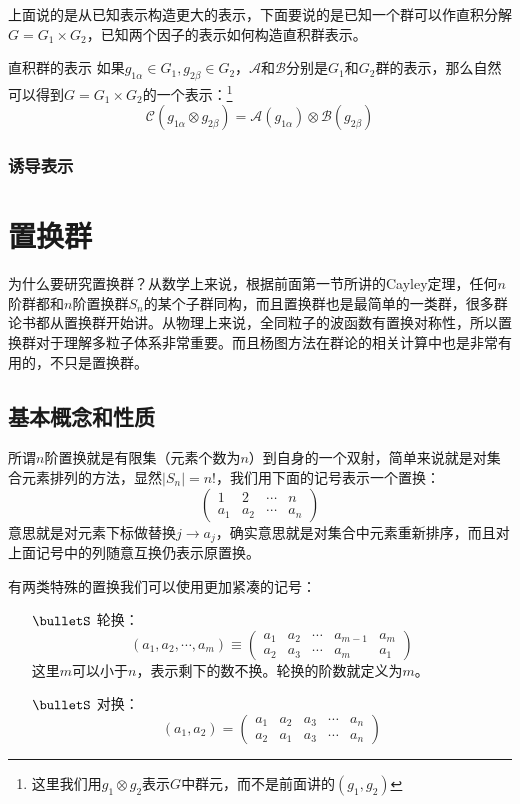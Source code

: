 上面说的是从已知表示构造更大的表示，下面要说的是已知一个群可以作直积分解$G=G_1\times G_2$，已知两个因子的表示如何构造直积群表示。
\begin{define}{直积群的表示}
	如果$g_{1\alpha}\in G_1,g_{2\beta}\in G_2$，$\mathscr{A}$和$\mathscr{B}$分别是$G_1$和$G_2$群的表示，那么自然可以得到$G=G_1\times G_2$的一个表示：\footnote{这里我们用$g_1\otimes g_2$表示$G$中群元，而不是前面讲的$(g_1,g_2)$}
	\[\mathscr{C}(g_{1\alpha}\otimes g_{2\beta})=\mathscr{A}(g_{1\alpha})\otimes\mathscr{B}(g_{2\beta})\]
\end{define}
\subsubsection*{诱导表示}




\section{置换群}
为什么要研究置换群？从数学上来说，根据前面第一节所讲的Cayley定理，任何$n$阶群都和$n$阶置换群$S_n$的某个子群同构，而且置换群也是最简单的一类群，很多群论书都从置换群开始讲。从物理上来说，全同粒子的波函数有置换对称性，所以置换群对于理解多粒子体系非常重要。而且杨图方法在群论的相关计算中也是非常有用的，不只是置换群。
\subsection{基本概念和性质}
所谓$n$阶置换就是有限集（元素个数为$n$）到自身的一个双射，简单来说就是对集合元素排列的方法，显然$|S_n|=n!$，我们用下面的记号表示一个置换：
\begin{equation}
	\begin{pmatrix}
		1&2  & \cdots &n \\
		a_1& a_2 & \cdots &a_n
	\end{pmatrix}
\end{equation}
意思就是对元素下标做替换$j\to a_j$，确实意思就是对集合中元素重新排序，而且对上面记号中的列随意互换仍表示原置换。

有两类特殊的置换我们可以使用更加紧凑的记号：
\begin{itemize}
	\item[$\bulletS$]轮换：
	\begin{equation*}
		\left(a_1,a_2,\cdots,a_m\right)\equiv\begin{pmatrix}
		a_1&a_2  & \cdots &a_{m-1}&a_m \\
		a_2& a_3 & \cdots&a_m &a_1
	\end{pmatrix}
	\end{equation*} 
	这里$m$可以小于$n$，表示剩下的数不换。轮换的阶数就定义为$m$。\\
	\item[$\bulletS$]对换：
	\begin{equation}
		\left(a_1,a_2\right)=\begin{pmatrix}
			a_1&a_2  & a_3&\cdots &a_n \\
			a_2& a_1 & a_3&\cdots&a_n 
		\end{pmatrix}
	\end{equation}
\end{itemize}

